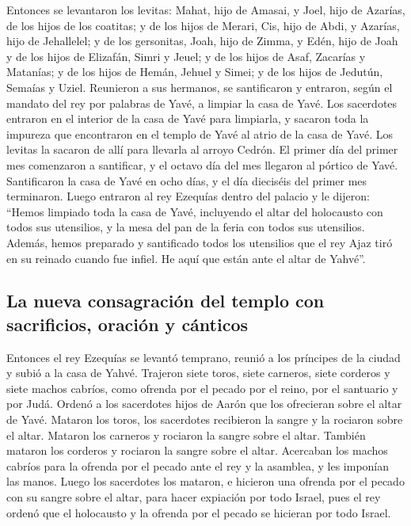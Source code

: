  Entonces se levantaron los levitas: Mahat, hijo de
Amasai, y Joel, hijo de Azarías, de los hijos de los coatitas; y de los
hijos de Merari, Cis, hijo de Abdi, y Azarías, hijo de Jehallelel; y de
los gersonitas, Joah, hijo de Zimma, y Edén, hijo de Joah
 y de los hijos de Elizafán, Simri y Jeuel; y de los
hijos de Asaf, Zacarías y Matanías;  y de los hijos de
Hemán, Jehuel y Simei; y de los hijos de Jedutún, Semaías y Uziel.
 Reunieron a sus hermanos, se santificaron y entraron,
según el mandato del rey por palabras de Yavé, a limpiar la casa de
Yavé.  Los sacerdotes entraron en el interior de la casa
de Yavé para limpiarla, y sacaron toda la impureza que encontraron en el
templo de Yavé al atrio de la casa de Yavé. Los levitas la sacaron de
allí para llevarla al arroyo Cedrón.  El primer día del
primer mes comenzaron a santificar, y el octavo día del mes llegaron al
pórtico de Yavé. Santificaron la casa de Yavé en ocho días, y el día
dieciséis del primer mes terminaron.  Luego entraron al
rey Ezequías dentro del palacio y le dijeron: ``Hemos limpiado toda la
casa de Yavé, incluyendo el altar del holocausto con todos sus
utensilios, y la mesa del pan de la feria con todos sus utensilios.
 Además, hemos preparado y santificado todos los
utensilios que el rey Ajaz tiró en su reinado cuando fue infiel. He aquí
que están ante el altar de Yahvé''.

\hypertarget{la-nueva-consagraciuxf3n-del-templo-con-sacrificios-oraciuxf3n-y-cuxe1nticos}{%
\subsection{La nueva consagración del templo con sacrificios, oración y
cánticos}\label{la-nueva-consagraciuxf3n-del-templo-con-sacrificios-oraciuxf3n-y-cuxe1nticos}}

 Entonces el rey Ezequías se levantó temprano, reunió a
los príncipes de la ciudad y subió a la casa de Yahvé. 
Trajeron siete toros, siete carneros, siete corderos y siete machos
cabríos, como ofrenda por el pecado por el reino, por el santuario y por
Judá. Ordenó a los sacerdotes hijos de Aarón que los ofrecieran sobre el
altar de Yavé.  Mataron los toros, los sacerdotes
recibieron la sangre y la rociaron sobre el altar. Mataron los carneros
y rociaron la sangre sobre el altar. También mataron los corderos y
rociaron la sangre sobre el altar.  Acercaban los machos
cabríos para la ofrenda por el pecado ante el rey y la asamblea, y les
imponían las manos.  Luego los sacerdotes los mataron, e
hicieron una ofrenda por el pecado con su sangre sobre el altar, para
hacer expiación por todo Israel, pues el rey ordenó que el holocausto y
la ofrenda por el pecado se hicieran por todo Israel.

